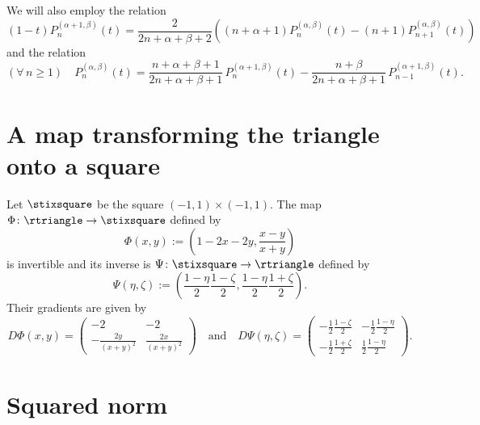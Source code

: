 \documentclass{article}
\numberwithin{equation}{section}
\numberwithin{figure}{section}
\begin{document}
%
We will also employ the relation \cite[Eq.~(4.5.4)]{Szego:1975}
%
\begin{equation}\label{JacobiTimesOneMinusArgShift}
(1-t) P^{(\alpha+1,\beta)}_n(t) = \frac{2}{2n+\alpha+\beta+2} \left( (n+\alpha+1) P^{(\alpha,\beta)}_n(t) - (n+1) P^{(\alpha,\beta)}_{n+1}(t) \right)
\end{equation}
%
and the relation \cite[Eq.~(6.4.21)]{AAR:1999}
%
\begin{equation}\label{JacobiAlphaIdShift}
(\forall\,n\geq 1) \quad P^{(\alpha,\beta)}_n(t) = \frac{n+\alpha+\beta+1}{2n+\alpha+\beta+1} \, P^{(\alpha+1,\beta)}_n(t) - \frac{n+\beta}{2n+\alpha+\beta+1} \, P^{(\alpha+1,\beta)}_{n-1}(t).
\end{equation}

\section{A map transforming the triangle onto a square}

Let $\stixsquare$ be the square $(-1,1) \times (-1,1)$.
The map $\Phi \colon \rtriangle \to \stixsquare$ defined by
%
\begin{equation}\label{Phi}
\Phi(x,y) := \left( 1-2x-2y, \frac{x-y}{x+y} \right)
\end{equation}
%
is invertible and its inverse is $\Psi \colon \stixsquare \to \rtriangle$ defined by
%
\begin{equation}\label{Psi}
\Psi(\eta,\zeta) := \left( \frac{1-\eta}{2} \frac{1-\zeta}{2}, \frac{1-\eta}{2} \frac{1+\zeta}{2} \right).
\end{equation}
%
Their gradients are given by
%
\begin{equation*}
D\Phi(x,y) = \begin{pmatrix} -2 & -2 \\ -\frac{2y}{(x+y)^2} & \frac{2x}{(x+y)^2} \end{pmatrix}
\quad\text{and}\quad
D\Psi(\eta,\zeta) = \begin{pmatrix} -\frac{1}{2} \frac{1-\zeta}{2} & -\frac{1}{2} \frac{1-\eta}{2} \\ -\frac{1}{2} \frac{1+\zeta}{2} & \frac{1}{2} \frac{1-\eta}{2} \end{pmatrix}.
\end{equation*}
%

\section{Squared norm}
\end{document}
